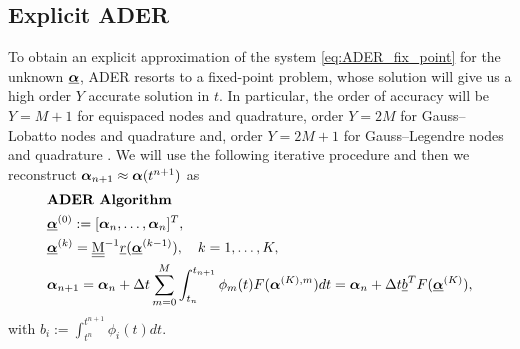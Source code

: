 %
%
\subsection{Explicit ADER}
To obtain an explicit approximation of the system \eqref{eq:ADER_fix_point} for the unknown $\underline{\boldsymbol{\alpha}}$, ADER resorts to a fixed-point problem, whose solution will give us a high order $Y$ accurate solution in $t$. In particular, the order of accuracy will be $Y=M+1$ for equispaced nodes and quadrature, order $Y=2M$ for Gauss--Lobatto nodes and quadrature and, order $Y=2M+1$ for Gauss--Legendre nodes and quadrature \cite{veiga2023improving}. 
We will use the following iterative procedure and then we reconstruct $\boldsymbol{\alpha}_{n+1}\approx\boldsymbol{\alpha}(t^{n+1})$ as %
\begin{equation}\label{eq:fixpoint_iteration}
\begin{aligned}
&\text{\textbf{ADER Algorithm}}\\
&\underline{\boldsymbol{\alpha}}^{(0)}:=[\boldsymbol{\alpha}_n,\dots, \boldsymbol{\alpha}_n ]^T,\\
&\underline{\boldsymbol{\alpha}}^{(k)}=\underline{\underline{\mathrm{M}}}^{-1} \underline{r}(\underline{\boldsymbol{\alpha}}^{(k-1)}), \quad k=1,\dots,K, \\
&\boldsymbol{\alpha}_{n+1}=\boldsymbol{\alpha}_n+\Delta t \sum_{m=0}^M \int_{t_n}^{t_{n+1}}\phi_m(t) F(\boldsymbol{\alpha}^{(K),m})dt=\boldsymbol{\alpha}_n+\Delta t \underline{b}^TF(\underline{\boldsymbol{\alpha}}^{(K)}),
\end{aligned}
\end{equation}
with $b_i:=\int_{t^n}^{t^{n+1}} \phi_i(t)dt$.

